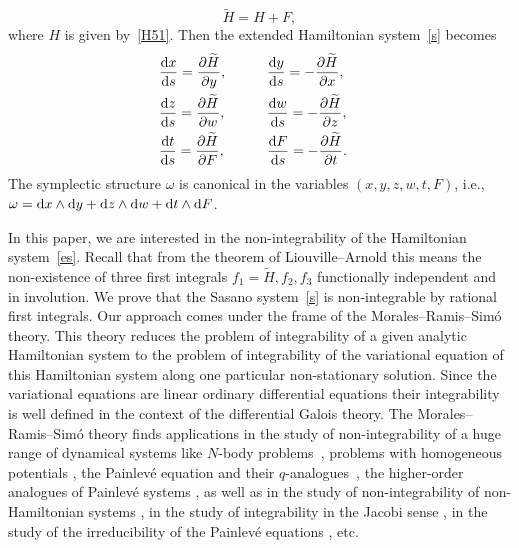 \documentclass[pdftex]{sigma}
\numberwithin{equation}{section}
\begin{document}
 \[
 \widetilde{H}=H+F ,
 \]
 where $H$ is given by~\eqref{H51}. Then the extended Hamiltonian system~\eqref{s} becomes
 \begin{alignat}{3}
 &\frac{{\rm d} x}{{\rm d} s}=\frac{\partial \widetilde{H}}{\partial y},\qquad &&
 \frac{{\rm d} y}{{\rm d} s}=-\frac{\partial \widetilde{H}}{\partial x},\nonumber&\\
 &\frac{{\rm d} z}{{\rm d} s}=\frac{\partial \widetilde{H}}{\partial w},\qquad &&
 \frac{{\rm d} w}{{\rm d} s}=-\frac{\partial \widetilde{H}}{\partial z},\nonumber&\\
 &\frac{{\rm d} t}{{\rm d} s}=\frac{\partial \widetilde{H}}{\partial F},\qquad &&
 \frac{{\rm d} F}{{\rm d} s}=-\frac{\partial \widetilde{H}}{\partial t} .&\label{es}
 \end{alignat}
 The symplectic structure $\omega$ is canonical in the variables $(x, y, z, w, t, F)$, i.e.,
 $\omega={\rm d} x \wedge {\rm d} y + {\rm d} z \wedge {\rm d} w + {\rm d} t \wedge {\rm d} F$.

 In this paper, we are interested in the non-integrability
 of the Hamiltonian system~\eqref{es}.
 Recall that from the theorem of Liouville--Arnold \cite{Ar} this means the non-existence of
 three first integrals $f_1=\widetilde{H}, f_2, f_3$ functionally independent and in involution.
 We prove that the Sasano system~\eqref{s} is non-integrable by rational first integrals. Our approach comes under the frame of the Morales--Ramis--Sim\'{o} theory. This theory
 reduces the problem of integrability of a given analytic Hamiltonian system to the problem of integrability of
 the variational equation of this Hamiltonian system along one particular non-stationary solution. Since the
 variational equations are linear ordinary differential equations their integrability is well defined in the context
 of the differential Galois theory. The Morales--Ramis--Sim\'o theory finds applications in the study of non-integrability of a huge range of dynamical systems like
 $N$-body problems~\mbox{\cite{BC, Co3, MPSS, PM, Ts1, Ts2}}, problems with homogeneous potentials \cite{CDMP, Co1, CMP}, the Painlev\'e equation and their $q$-analogues~\mbox{\cite{CR, F, M, St1, St2, St3}},
 the higher-order analogues of Painlev\'e systems \cite{St4},
 as well as in the study of non-integrability of non-Hamiltonian systems \cite{AZ, C}, in the study of integrability in the Jacobi sense \cite{MP}, in the study of the irreducibility
of the Painlev\'e equations \cite{CW}, etc.
\end{document}
